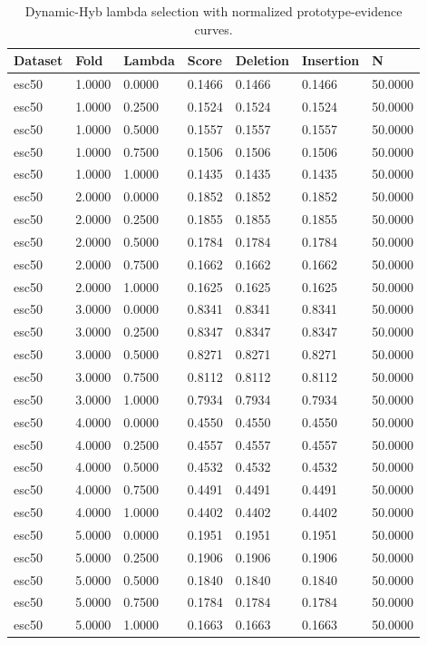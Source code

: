 \begin{table}[htbp]
\centering
\caption{Dynamic-Hyb lambda selection with normalized prototype-evidence curves.}
\label{tab:dynamic-fpde-lambda}
\begin{tabular}{lllllll}
\toprule
Dataset & Fold & Lambda & Score & Deletion & Insertion & N \\
\midrule
esc50 & 1.0000 & 0.0000 & 0.1466 & 0.1466 & 0.1466 & 50.0000 \\
esc50 & 1.0000 & 0.2500 & 0.1524 & 0.1524 & 0.1524 & 50.0000 \\
esc50 & 1.0000 & 0.5000 & 0.1557 & 0.1557 & 0.1557 & 50.0000 \\
esc50 & 1.0000 & 0.7500 & 0.1506 & 0.1506 & 0.1506 & 50.0000 \\
esc50 & 1.0000 & 1.0000 & 0.1435 & 0.1435 & 0.1435 & 50.0000 \\
esc50 & 2.0000 & 0.0000 & 0.1852 & 0.1852 & 0.1852 & 50.0000 \\
esc50 & 2.0000 & 0.2500 & 0.1855 & 0.1855 & 0.1855 & 50.0000 \\
esc50 & 2.0000 & 0.5000 & 0.1784 & 0.1784 & 0.1784 & 50.0000 \\
esc50 & 2.0000 & 0.7500 & 0.1662 & 0.1662 & 0.1662 & 50.0000 \\
esc50 & 2.0000 & 1.0000 & 0.1625 & 0.1625 & 0.1625 & 50.0000 \\
esc50 & 3.0000 & 0.0000 & 0.8341 & 0.8341 & 0.8341 & 50.0000 \\
esc50 & 3.0000 & 0.2500 & 0.8347 & 0.8347 & 0.8347 & 50.0000 \\
esc50 & 3.0000 & 0.5000 & 0.8271 & 0.8271 & 0.8271 & 50.0000 \\
esc50 & 3.0000 & 0.7500 & 0.8112 & 0.8112 & 0.8112 & 50.0000 \\
esc50 & 3.0000 & 1.0000 & 0.7934 & 0.7934 & 0.7934 & 50.0000 \\
esc50 & 4.0000 & 0.0000 & 0.4550 & 0.4550 & 0.4550 & 50.0000 \\
esc50 & 4.0000 & 0.2500 & 0.4557 & 0.4557 & 0.4557 & 50.0000 \\
esc50 & 4.0000 & 0.5000 & 0.4532 & 0.4532 & 0.4532 & 50.0000 \\
esc50 & 4.0000 & 0.7500 & 0.4491 & 0.4491 & 0.4491 & 50.0000 \\
esc50 & 4.0000 & 1.0000 & 0.4402 & 0.4402 & 0.4402 & 50.0000 \\
esc50 & 5.0000 & 0.0000 & 0.1951 & 0.1951 & 0.1951 & 50.0000 \\
esc50 & 5.0000 & 0.2500 & 0.1906 & 0.1906 & 0.1906 & 50.0000 \\
esc50 & 5.0000 & 0.5000 & 0.1840 & 0.1840 & 0.1840 & 50.0000 \\
esc50 & 5.0000 & 0.7500 & 0.1784 & 0.1784 & 0.1784 & 50.0000 \\
esc50 & 5.0000 & 1.0000 & 0.1663 & 0.1663 & 0.1663 & 50.0000 \\
\bottomrule
\end{tabular}
\end{table}
